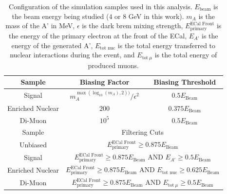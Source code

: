 \begin{table}
  \centering
  \begin{tabular}{|c|c|c|}
      \hline
      Sample & Biasing Factor & Biasing Threshold
      \\ \hline
      Signal & $m_A^{\max(\log_{10}(m_A),2))}/\epsilon^2$ & $0.5E_\text{Beam}$
      \\
      Enriched Nuclear & $200$ & $0.375E_\text{Beam}$
      \\
      Di-Muon & $10^5$ & $0.5E_\text{Beam}$
      \\
      \hline \hline
      Sample & \multicolumn{2}{c|}{Filtering Cuts}
      \\ \hline
      Unbiased  
          & \multicolumn{2}{c|}{$E_{\text{primary}}^{\text{ECal Front}} \geq 0.875E_\text{Beam}$}
      \\
      Signal 
          & \multicolumn{2}{c|}{$E_{\text{primary}}^{\text{ECal Front}} \geq 0.875E_\text{Beam}$ AND $E_{A'}\geq 0.5E_\text{Beam}$}
      \\
      Enriched Nuclear
          & \multicolumn{2}{c|}{$E_{\text{primary}}^{\text{ECal Front}} \geq 0.875E_\text{Beam}$ AND $E_{\text{tot nuc}}\geq 0.625E_\text{Beam}$}
      \\
      Di-Muon
          & \multicolumn{2}{c|}{$E_{\text{primary}}^{\text{ECal Front}} \geq 0.875E_\text{Beam}$ AND $E_{\text{tot}~\mu}\geq 0.5E_\text{Beam}$}
      \\ \hline
  \end{tabular}
  \caption{Configuration of the simulation samples used in this analysis.
  $E_\mathrm{beam}$ is the beam energy being studied ($4$ or $8$ GeV in this work).
  $m_A$ is the mass of the A' in MeV, $\epsilon$ is the dark brem mixing strength,
  $E_{\text{primary}}^{\text{ECal Front}}$ is the energy of the primary electron at the
  front of the ECal, $E_{A'}$ is the energy of the generated A',
  $E_{\text{tot nuc}}$ is the total energy transferred to nuclear interactions during the event,
  and $E_{\text{tot}~\mu}$ is the total energy of produced muons.}
  \label{tab:sample-summary}
\end{table}